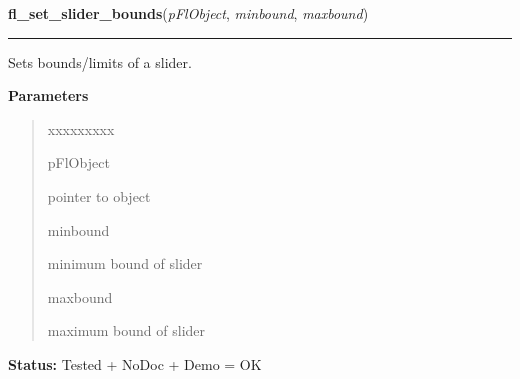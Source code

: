 \hspace{.8\funcindent}\begin{boxedminipage}{\funcwidth}

    \raggedright \textbf{fl\_set\_slider\_bounds}(\textit{pFlObject}, \textit{minbound}, \textit{maxbound})

    \vspace{-1.5ex}

    \rule{\textwidth}{0.5\fboxrule}
\setlength{\parskip}{2ex}
    Sets bounds/limits of a slider.

\setlength{\parskip}{1ex}
      \textbf{Parameters}
      \vspace{-1ex}

      \begin{quote}
        \begin{Ventry}{xxxxxxxxx}

          \item[pFlObject]

          pointer to object

          \item[minbound]

          minimum bound of slider

          \item[maxbound]

          maximum bound of slider

        \end{Ventry}

      \end{quote}

\textbf{Status:} Tested + NoDoc + Demo = OK



    \end{boxedminipage}

    \label{xformslib:flslider:fl_get_slider_bounds}

    \vspace{0.5ex}

